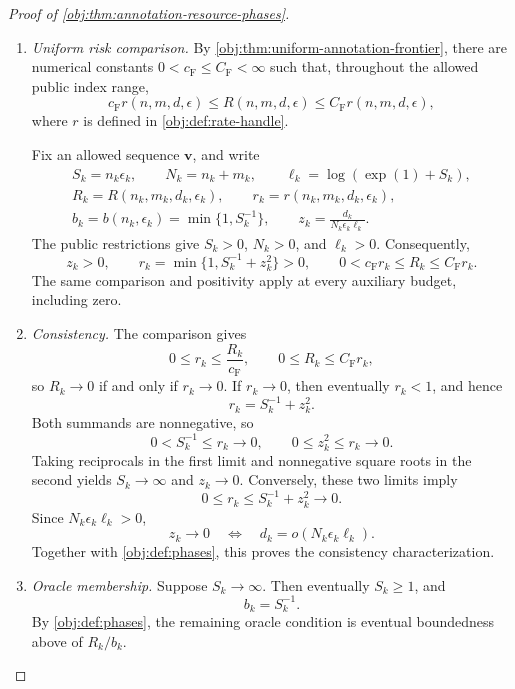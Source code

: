 \documentclass[11pt]{article}
\begin{document}
\begin{proof}[Proof of \cref{obj:thm:annotation-resource-phases}]
\begin{enumerate}
\item \emph{Uniform risk comparison.}
By \cref{obj:thm:uniform-annotation-frontier}, there are numerical constants \(0<c_{\mathrm F}\le C_{\mathrm F}<\infty\) such that, throughout the allowed public index range,
\[
c_{\mathrm F}r(n,m,d,\epsilon)
\le R(n,m,d,\epsilon)
\le C_{\mathrm F}r(n,m,d,\epsilon),
\]
where \(r\) is defined in \cref{obj:def:rate-handle}.

Fix an allowed sequence \(\mathbf v\), and write
\[
\begin{gathered}
S_k=n_k\epsilon_k,\qquad
N_k=n_k+m_k,\qquad
\ell_k=\log(\exp(1)+S_k),\\
R_k=R(n_k,m_k,d_k,\epsilon_k),\qquad
r_k=r(n_k,m_k,d_k,\epsilon_k),\\
b_k=b(n_k,\epsilon_k)=\min\{1,S_k^{-1}\},\qquad
z_k=\frac{d_k}{N_k\epsilon_k\ell_k}.
\end{gathered}
\]
The public restrictions give \(S_k>0\), \(N_k>0\), and \(\ell_k>0\). Consequently,
\[
z_k>0,\qquad
r_k=\min\{1,S_k^{-1}+z_k^2\}>0,\qquad
0<c_{\mathrm F}r_k\le R_k\le C_{\mathrm F}r_k.
\]
The same comparison and positivity apply at every auxiliary budget, including zero.

\item \emph{Consistency.}
The comparison gives
\[
0\le r_k\le \frac{R_k}{c_{\mathrm F}},
\qquad
0\le R_k\le C_{\mathrm F}r_k,
\]
so \(R_k\to0\) if and only if \(r_k\to0\). If \(r_k\to0\), then eventually \(r_k<1\), and hence
\[
r_k=S_k^{-1}+z_k^2.
\]
Both summands are nonnegative, so
\[
0<S_k^{-1}\le r_k\longrightarrow0,
\qquad
0\le z_k^2\le r_k\longrightarrow0.
\]
Taking reciprocals in the first limit and nonnegative square roots in the second yields \(S_k\to\infty\) and \(z_k\to0\). Conversely, these two limits imply
\[
0\le r_k\le S_k^{-1}+z_k^2\longrightarrow0.
\]
Since \(N_k\epsilon_k\ell_k>0\),
\[
z_k\longrightarrow0
\quad\Longleftrightarrow\quad
d_k=o(N_k\epsilon_k\ell_k).
\]
Together with \cref{obj:def:phases}, this proves the consistency characterization.

\item \emph{Oracle membership.}
Suppose \(S_k\to\infty\). Then eventually \(S_k\ge1\), and
\[
b_k=S_k^{-1}.
\]
By \cref{obj:def:phases}, the remaining oracle condition is eventual boundedness above of \(R_k/b_k\).


\end{enumerate}
\end{proof}
\end{document}
